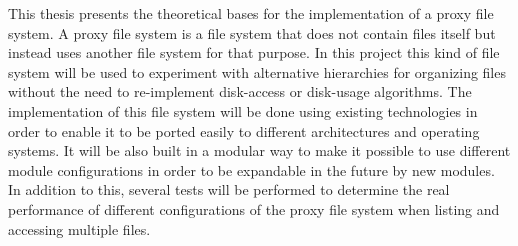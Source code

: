 


\begin{abstracts}        %

This thesis presents the theoretical bases for the implementation of a proxy file system. A proxy file system is a file system that does not contain files itself but instead uses another file system for that purpose. In this project this kind of file system will be used to experiment with alternative hierarchies for organizing files without the need to re-implement disk-access or disk-usage algorithms. The implementation of this file system will be done using existing technologies in order to enable it to be ported easily to different architectures and operating systems. It will be also built in a modular way to make it possible to use different module configurations in order to be expandable in the future by new modules. In addition to this, several tests will be performed to determine the real performance of different configurations of the proxy file system when listing and accessing multiple files.

\end{abstracts}




